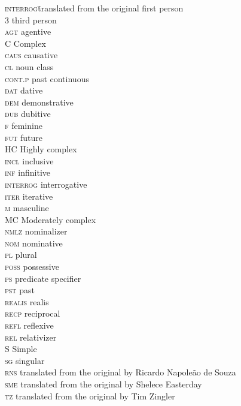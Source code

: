 \addchap{\lsAbbreviationsTitle} 
\begin{tabbing}
\textsc{interrog}\hspace{1em}\= translated from the original                 \> first person\\
3                 \> third person\\
\textsc{agt}      \> agentive\\
C                 \> Complex\\
\textsc{caus}     \> causative\\
\textsc{cl}       \> noun class\\
\textsc{cont.p}   \> past continuous\\
\textsc{dat}      \> dative\\
\textsc{dem}      \> demonstrative\\
\textsc{dub}      \> dubitive\\
\textsc{f}        \> feminine\\
\textsc{fut}      \> future\\
HC                \> Highly complex\\
\textsc{incl}     \> inclusive\\
\textsc{inf}      \> infinitive\\
\textsc{interrog} \> interrogative\\
\textsc{iter}     \> iterative\\
\textsc{m}        \> masculine\\
MC                \> Moderately complex\\
\textsc{nmlz}     \> nominalizer\\
\textsc{nom}      \> nominative\\
\textsc{pl}       \> plural\\
\textsc{poss}     \> possessive\\
\textsc{ps}       \> predicate specifier\\
\textsc{pst}      \> past\\
\textsc{realis}   \> realis\\
\textsc{recp}     \> reciprocal\\
\textsc{refl}     \> reflexive\\
\textsc{rel}      \> relativizer\\
S                 \> Simple\\
\textsc{sg}       \> singular\\
\textsc{rns}      \> translated from the original by Ricardo Napoleão de Souza\\
\textsc{sme}      \> translated from the original by Shelece Easterday\\
\textsc{tz}       \> translated from the original by Tim Zingler\\
\end{tabbing}
